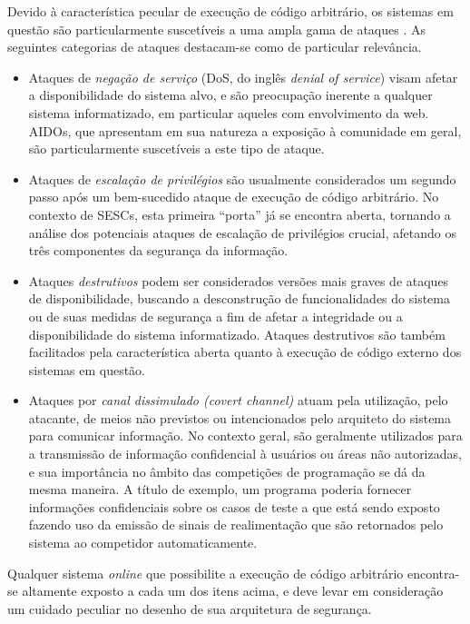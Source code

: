 \documentclass[ruledheader, 12pt]{abnt}
\begin{document}
Devido à característica pecular de execução de código arbitrário, os sistemas em questão são particularmente suscetíveis a uma ampla gama de ataques \cite{tochev2010,forisek2006security}. As seguintes categorias de ataques destacam-se como de particular relevância.
\begin{itemize}
	\item Ataques de \emph{negação de serviço} (DoS, do inglês \emph{denial of service}) visam afetar a disponibilidade do sistema alvo, e são preocupação inerente a qualquer sistema informatizado, em particular aqueles com envolvimento da web. AIDOs, que apresentam em sua natureza a exposição à comunidade em geral, são particularmente suscetíveis a este tipo de ataque.
	
	\item Ataques de \emph{escalação de privilégios} são usualmente considerados um segundo passo após um bem-sucedido ataque de execução de código arbitrário. No contexto de SESCs, esta primeira ``porta'' já se encontra aberta, tornando a análise dos potenciais ataques de escalação de privilégios crucial, afetando os três componentes da segurança da informação.
	
	\item Ataques \emph{destrutivos} podem ser considerados versões mais graves de ataques de disponibilidade, buscando a desconstrução de funcionalidades do sistema ou de suas medidas de segurança a fim de afetar a integridade ou a disponibilidade do sistema informatizado. Ataques destrutivos são também facilitados pela característica aberta quanto à execução de código externo dos sistemas em questão.
	
	\item Ataques por \emph{canal dissimulado (covert channel)} atuam pela utilização, pelo atacante, de meios não previstos ou intencionados pelo arquiteto do sistema para comunicar informação. No contexto geral, são geralmente utilizados para a transmissão de informação confidencial à usuários ou áreas não autorizadas, e sua importância no âmbito das competições de programação se dá da mesma maneira. A título de exemplo, um programa poderia fornecer informações confidenciais sobre os casos de teste a que está sendo exposto fazendo uso da emissão de sinais de realimentação que são retornados pelo sistema ao competidor automaticamente.
\end{itemize}

Qualquer sistema \emph{online} que possibilite a execução de código arbitrário encontra-se altamente exposto a cada um dos itens acima, e deve levar em consideração um cuidado peculiar no desenho de sua arquitetura de segurança.
\end{document}

